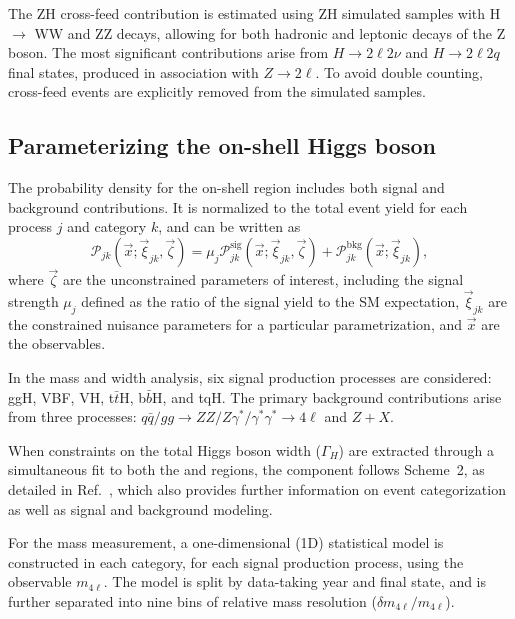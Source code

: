 The ZH cross-feed contribution is estimated using \onshell ZH simulated samples with H $\to$ WW and ZZ decays, allowing for both hadronic and leptonic decays of the Z boson. The most significant contributions arise from $H \to 2\ell 2\nu$ and $H \to 2\ell 2q$ final states, produced in association with $Z \to 2\ell$. To avoid double counting, \onshell cross-feed events are explicitly removed from the \offshell simulated samples.

\subsection{Parameterizing the on-shell Higgs boson} \label{sec:onshell}

The probability density for the on-shell region includes both signal and background contributions.  It is normalized to the total event yield for each process $j$ and category $k$, and can be written as
\begin{equation}
  \mathcal{P}_{jk}(\vec{x};\vec{\xi}_{jk},\vec\zeta) = 
  \mu_j\mathcal{P}_{jk}^\text{sig} (\vec{x};\vec{\xi}_{jk},\vec\zeta) +
  \mathcal{P}_{jk}^\text{bkg}(\vec{x};\vec{\xi}_{jk}),
  \label{eq:ponshell}
\end{equation}
where $\vec\zeta$ are the unconstrained parameters of interest,
including the signal strength $\mu_j$ defined as the ratio of the signal yield to the SM expectation,
$\vec{\xi}_{jk}$ are the constrained nuisance parameters for a particular parametrization,
and $\vec{x}$ are the observables.

In the \onshell \Hboson mass and width analysis, six signal production processes are considered: ggH, VBF, VH, t$\bar{t}$H, b$\bar{b}$H, and tqH. The primary background contributions arise from three processes: $q\bar{q}/gg \to ZZ/Z\gamma^*/\gamma^*\gamma^* \to 4\ell$ and $Z+X$. 

When constraints on the total Higgs boson width ($\Gamma_H$) are extracted through a simultaneous fit to both the \onshell and \offshell regions, the \onshell component follows Scheme~2, as detailed in Ref.~\cite{CMS:2021nnc}, which also provides further information on event categorization as well as signal and background modeling.

For the \Hboson mass measurement, a one-dimensional (1D) statistical model is constructed in each category, for each signal production process, using the observable $m_{4\ell}$. The model is split by data-taking year and final state, and is further separated into nine bins of relative mass resolution ($\delta m_{4\ell}/m_{4\ell}$). 

